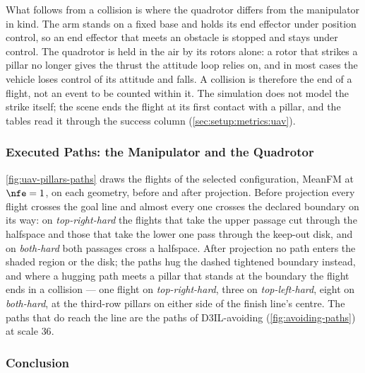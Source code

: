 What follows from a collision is where the quadrotor differs from the manipulator in kind. The arm stands on
a fixed base and holds its end effector under position control, so an end effector that meets an obstacle is
stopped and stays under control. The quadrotor is held in the air by its rotors alone: a rotor that strikes a
pillar no longer gives the thrust the attitude loop relies on, and in most cases the vehicle loses control of
its attitude and falls. A collision is therefore the end of a flight, not an event to be counted within it.
The simulation does not model the strike itself; the scene ends the flight at its first contact with a
pillar, and the tables read it through the success column (\autoref{sec:setup:metrics:uav}).

\FloatBarrier
\subsubsection{Executed Paths: the Manipulator and the Quadrotor}\label{sec:res:uav:pillars:projected}

\autoref{fig:uav-pillars-paths} draws the flights of the selected configuration, MeanFM at $\nfe=1$, on
each geometry, before and after projection. Before projection every flight crosses the goal line and
almost every one crosses the declared boundary on its way: on \emph{top-right-hard} the flights that
take the upper passage cut through the halfspace and those that take the lower one pass through the
keep-out disk, and on \emph{both-hard} both passages cross a halfspace. After projection no path enters
the shaded region or the disk; the paths hug the dashed tightened boundary instead, and where a hugging
path meets a pillar that stands at the boundary the flight ends in a collision --- one flight on
\emph{top-right-hard}, three on \emph{top-left-hard}, eight on \emph{both-hard}, at the third-row pillars
on either side of the finish line's centre. The paths that do reach the line are the paths of
D3IL-avoiding (\autoref{fig:avoiding-paths}) at scale $36$.

\FloatBarrier
\subsubsection{Conclusion}\label{sec:res:uav:pillars:conclusion}

